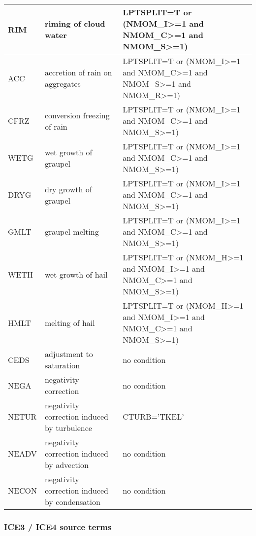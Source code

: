 \begin{longtable} {|p{}|p{}|p{}|}
RIM    & riming of cloud water                         & LPTSPLIT=T or (NMOM\_I>=1 and NMOM\_C>=1 and NMOM\_S>=1) \\\hline
ACC    & accretion of rain on aggregates               & LPTSPLIT=T or (NMOM\_I>=1 and NMOM\_C>=1 and NMOM\_S>=1 and NMOM\_R>=1) \\\hline
CFRZ   & conversion freezing of rain                   & LPTSPLIT=T or (NMOM\_I>=1 and NMOM\_C>=1 and NMOM\_S>=1) \\\hline
WETG   & wet growth of graupel                         & LPTSPLIT=T or (NMOM\_I>=1 and NMOM\_C>=1 and NMOM\_S>=1) \\\hline
DRYG   & dry growth of graupel                         & LPTSPLIT=T or (NMOM\_I>=1 and NMOM\_C>=1 and NMOM\_S>=1) \\\hline
GMLT   & graupel melting                               & LPTSPLIT=T or (NMOM\_I>=1 and NMOM\_C>=1 and NMOM\_S>=1) \\\hline
WETH   & wet growth of hail                            & LPTSPLIT=T or (NMOM\_H>=1 and NMOM\_I>=1 and NMOM\_C>=1 and NMOM\_S>=1) \\\hline
HMLT   & melting of hail                               & LPTSPLIT=T or (NMOM\_H>=1 and NMOM\_I>=1 and NMOM\_C>=1 and NMOM\_S>=1) \\\hline
CEDS   & adjustment to saturation                      & no condition \\\hline
NEGA   & negativity correction                         & no condition \\\hline
NETUR  & negativity correction induced by turbulence   & CTURB='TKEL' \\\hline
NEADV  & negativity correction induced by advection    & no condition \\\hline
NECON  & negativity correction induced by condensation & no condition \\\hline
\end{longtable}

\subsubsection{ICE3 / ICE4 source terms}

